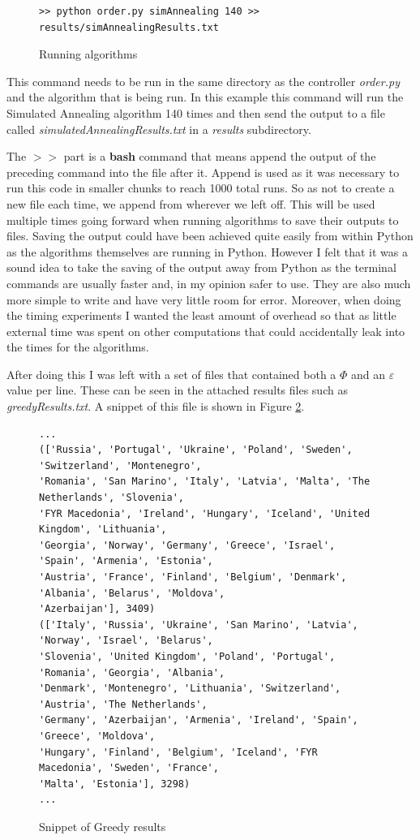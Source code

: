 \documentclass[12pt]{report}
\begin{document}
\begin{figure}[H]
\caption{Running algorithms}
\label{makeResults}
\begin{verbatim}
>> python order.py simAnnealing 140 >> results/simAnnealingResults.txt
\end{verbatim}
\end{figure}
This command needs to be run in the same directory as the controller \textit{order.py} and the algorithm that is being run. In this example this command will run the Simulated Annealing algorithm 140 times and then send the output to a file called \textit{simulatedAnnealingResults.txt} in a \textit{results} subdirectory. 

The $>>$ part is a \textbf{bash} command that means append the output of the preceding command into the file after it. Append is used as it was necessary to run this code in smaller chunks to reach 1000 total runs. So as not to create a new file each time, we append from wherever we left off. This will be used multiple times going forward when running algorithms to save their outputs to files. Saving the output could have been achieved quite easily from within Python as the algorithms themselves are running in Python. However I felt that it was a sound idea to take the saving of the output away from Python as the terminal commands are usually faster and, in my opinion safer to use. They are also much more simple to write and have very little room for error. Moreover, when doing the timing experiments I wanted the least amount of overhead so that as little external time was spent on other computations that could accidentally leak into the times for the algorithms.

After doing this I was left with a set of files that contained both a $\Phi$ and an $\varepsilon$ value per line. These can be seen in the attached results files such as \textit{greedyResults.txt}. A snippet of this file is shown in Figure \ref{greedyResFile}.

\begin{figure}[H]
\caption{Snippet of Greedy results}
\label{greedyResFile}
\begin{verbatim}
...
(['Russia', 'Portugal', 'Ukraine', 'Poland', 'Sweden', 'Switzerland', 'Montenegro',
'Romania', 'San Marino', 'Italy', 'Latvia', 'Malta', 'The Netherlands', 'Slovenia', 
'FYR Macedonia', 'Ireland', 'Hungary', 'Iceland', 'United Kingdom', 'Lithuania', 
'Georgia', 'Norway', 'Germany', 'Greece', 'Israel', 'Spain', 'Armenia', 'Estonia', 
'Austria', 'France', 'Finland', 'Belgium', 'Denmark', 'Albania', 'Belarus', 'Moldova', 
'Azerbaijan'], 3409)
(['Italy', 'Russia', 'Ukraine', 'San Marino', 'Latvia', 'Norway', 'Israel', 'Belarus', 
'Slovenia', 'United Kingdom', 'Poland', 'Portugal', 'Romania', 'Georgia', 'Albania', 
'Denmark', 'Montenegro', 'Lithuania', 'Switzerland', 'Austria', 'The Netherlands', 
'Germany', 'Azerbaijan', 'Armenia', 'Ireland', 'Spain', 'Greece', 'Moldova', 
'Hungary', 'Finland', 'Belgium', 'Iceland', 'FYR Macedonia', 'Sweden', 'France', 
'Malta', 'Estonia'], 3298)
...
\end{verbatim}
\end{figure}
\end{document}
